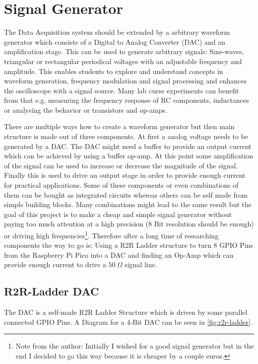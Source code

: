 \section{Signal Generator}

The Data Acquisition system should be extended by a arbitrary waveform generator which consists of a Digital to Analog Converter (DAC) and an amplification stage. This can be used to generate arbitrary signals: Sine-waves, triangular or rectangular periodical voltages with an adjustable frequency and amplitude. This enables students to explore and understand concepts in waveform generation, frequency modulation and signal processing and enhances the oscilloscope with a signal source. Many lab curse experiments can benefit from that e.g. measuring the frequency response of RC components, inductances or analysing the behavior or transistors and op-amps.

There are multiple ways how to create a waveform generator but then main structure is made out of three components. At first a analog voltage needs to be generated by a DAC. The DAC might need a buffer to provide an output current which can be achieved by using a buffer op-amp. At this point some amplification of the signal can be used to increase or decrease the magnitude of the signal. Finally this is used to drive an output stage in order to provide enough current for practical applications. Some of these components or even combinations of them can be bought as integrated circuits whereas others can be self made from simple building blocks. Many combinations might lead to the same result but the goal of this project is to make a cheap and simple signal generator without paying too much attention at a high precision (8 Bit resolution should be enough) or driving high frequencies\footnote{Note from the author: Initially I wished for a good signal generator but in the end I decided to go this way because it is cheaper by a couple euros.}. Therefore after a long time of researching components the way to go is: Using a R2R Ladder structure to turn 8 GPIO Pins from the Raspberry Pi Pico into a DAC and finding an Op-Amp which can provide enough current to drive a $\SI{50}{\Omega}$ signal line.

\subsection{R2R-Ladder DAC}

The DAC is a self-made R2R Ladder Structure which is driven by some parallel connected GPIO Pins. A Diagram for a 4-Bit DAC can be seen in \cref{fig:r2r-ladder}.

